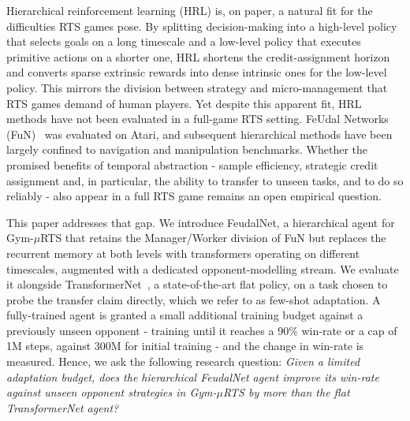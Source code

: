 \documentclass[sigconf,review=false]{acmart}
\begin{document}
Hierarchical reinforcement learning (HRL) is, on paper, a natural fit for the difficulties RTS games pose. By splitting decision-making into a high-level policy that selects goals on a long timescale and a low-level policy that executes primitive actions on a shorter one, HRL shortens the credit-assignment horizon and converts sparse extrinsic rewards into dense intrinsic ones for the low-level policy. 
This mirrors the division between strategy and micro-management that RTS games demand of human players. Yet despite this apparent fit,
HRL methods have not been evaluated in a full-game RTS setting.
FeUdal Networks (FuN)~\cite{FuN} was evaluated on Atari, and subsequent hierarchical methods have been largely confined to navigation and manipulation benchmarks. Whether the promised benefits of temporal abstraction - sample efficiency, strategic credit assignment and, in particular, the ability to transfer to unseen tasks, and to do so reliably - also appear in a full RTS game remains an open empirical question.

This paper addresses that gap. We introduce FeudalNet, a hierarchical agent for Gym-$\mu$RTS that retains the Manager/Worker division of FuN but replaces the recurrent memory at both levels with transformers operating on different timescales, augmented with a dedicated opponent-modelling stream. 
We evaluate it alongside TransformerNet~\cite{transformernet}, a state-of-the-art flat policy, on a task chosen to probe the transfer claim directly, which we refer to as few-shot adaptation. 
A fully-trained agent is granted a small additional training budget against a previously unseen opponent - training until it reaches a 90\% win-rate or a cap of 1M steps, against 300M for initial training - and the change in win-rate is measured. Hence, we ask the following research question: \emph{Given a limited adaptation budget, does the hierarchical FeudalNet agent improve its win-rate against unseen opponent strategies in Gym-$\mu$RTS by more than the flat TransformerNet agent?}
\end{document}
